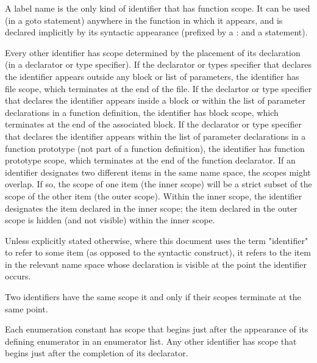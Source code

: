 \documentclass{article}
\begin{document}
A label name is the only kind of identifier that has function scope.  It can be used (in 
a goto statement) anywhere in the function in which it appears, and is declared
implicitly by its syntactic appearance (prefixed by a : and a statement).
\linebreak

Every other identifier has scope determined by the placement of its declaration (in a 
declarator or type specifier).  If the declarator or types specifier that declares the 
identifier appears outside any block or list of parameters, the identifier has file 
scope,  which terminates at the end of the file.  If the declartor or type specifier that
declares the identifier appears inside a block or within the list of parameter
declarations in a  function definition, the identifier has block scope, which terminates
at the end of the  associated block.  If the declarator or type specifier that declares 
the identifier appears  within the list of parameter declarations in a function prototype
(not part of a function definition), the identifier has function prototype scope, which 
terminates at the end of the function declarator.  If an identifier designates two 
different items in the same  name space, the scopes might overlap.  If so, the scope of 
one item (the inner scope) will be a strict subset of the scope of the other item (the 
outer scope). Within the inner scope, the identifier designates the item declared in the
inner scope; the item declared in the  outer scope is hidden (and not visible) within 
the inner scope.
\linebreak

Unless explicitly stated otherwise, where this document uses the term "identifier" to 
refer to some item (as opposed to the syntactic construct), it refers to the item in the 
relevant name space whose declaration is visible at the point the identifier occurs.
\linebreak

Two identifiers have the same scope it and only if their scopes terminate at the same 
point.
\linebreak

Each enumeration constant has scope that begins just after the appearance of its defining
enumerator in an enumerator list. Any other identifier has scope that begins just after 
the completion of its declarator.

\end{document}
